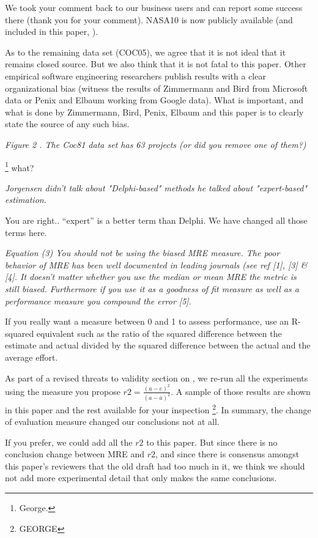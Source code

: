 \documentclass[smallcondesed]{svjour3}
\begin{document}
We took your comment back to our business users and can report some success there (thank you for your comment).
NASA10 is now publicly available (and included in this paper, ).

As to the remaining data set (COC05),
we agree that it is not ideal that it remains closed source.  But
we also think that it is not fatal to this paper. 
Other empirical software engineering researchers publish
results with a clear organizational bias (witness the results
of Zimmermann and Bird from Microsoft data
or Penix and Elbaum working from Google data). What is important, and what is done by Zimmermann, Bird,
Penix, Elbaum and this paper is to clearly state the source of any such bias.

{\em Figure 2 . The Coc81 data set has 63 projects (or did you remove one of them?)}

\footnote{George.} what?

{\em Jorgensen didn't talk about "Delphi-based" methods he talked about  "expert-based" estimation.}

You are right.. ``expert'' is a better term than Delphi. We have changed all those terms here.


{\em Equation (3) You should not be using the biased
  MRE measure. The poor behavior of MRE has been
  well documented in leading journals (see ref [1],
  [3] \& [4]. It doesn't matter whether you use the
  median or mean MRE the metric is still
  biased. Furthermore if you use it as a goodness of
  fit measure as well as a performance measure you
  compound the error [5].

  If you really want a measure between 0 and 1 to
  assess performance, use an R-squared equivalent
  such as the ratio of the squared difference
  between the estimate and actual divided by the
  squared difference between the actual and the
  average effort.  }

As part of a revised threats to validity section on , we 
re-run all the experiments using the measure you propose $r2=\frac{(a-e)^2}{(a - \overline{a})^2}$.
A sample of those results are shown in this paper and the rest available for
your  inspection \footnote{GEORGE}. In summary, the change of evaluation measure
changed our conclusions not at all.


If you prefer,  we could add all the $r2$ to this paper.
But since there is no conclusion change between MRE and $r2$, and since there is consensus amongst this paper's
reviewers that the old draft had too much in it, we think we should not
add  more experimental detail that
only makes the same conclusions.
\end{document}
